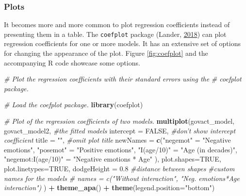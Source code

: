 \documentclass[doc,floatsintext]{apa6}
\newenvironment{Shaded}{\begin{snugshade}}{\end{snugshade}}
\newcommand{\KeywordTok}[1]{\textcolor[rgb]{0.13,0.29,0.53}{\textbf{#1}}}
\newcommand{\DataTypeTok}[1]{\textcolor[rgb]{0.13,0.29,0.53}{#1}}
\newcommand{\FloatTok}[1]{\textcolor[rgb]{0.00,0.00,0.81}{#1}}
\newcommand{\StringTok}[1]{\textcolor[rgb]{0.31,0.60,0.02}{#1}}
\newcommand{\CommentTok}[1]{\textcolor[rgb]{0.56,0.35,0.01}{\textit{#1}}}
\newcommand{\OtherTok}[1]{\textcolor[rgb]{0.56,0.35,0.01}{#1}}
\newcommand{\OperatorTok}[1]{\textcolor[rgb]{0.81,0.36,0.00}{\textbf{#1}}}
\newcommand{\NormalTok}[1]{#1}
\begin{document}
\subsubsection{Plots}\label{plots}

It becomes more and more common to plot regression coefficients instead
of presenting them in a table. The \texttt{coefplot} package (Lander,
\protect\hyperlink{ref-R-coefplot}{2018}) can plot regression
coefficients for one or more models. It has an extensive set of options
for changing the appearance of the plot. Figure \ref{fig:coefplot} and
the accompanying R code showcase some options.

\begin{Shaded}
\begin{Highlighting}[]
\CommentTok{# Plot the regression coefficients with their standard errors using the}
\CommentTok{# coefplot package.}

\CommentTok{# Load the coefplot package.}
\KeywordTok{library}\NormalTok{(coefplot)}

\CommentTok{# Plot of the regression coefficients of two models.}
\KeywordTok{multiplot}\NormalTok{(govact_model, govact_model2, }\CommentTok{#the fitted models}
          \DataTypeTok{intercept =} \OtherTok{FALSE}\NormalTok{, }\CommentTok{#don't show intercept coefficient}
          \DataTypeTok{title =} \StringTok{""}\NormalTok{, }\CommentTok{#omit plot title}
          \DataTypeTok{newNames =} \KeywordTok{c}\NormalTok{(}\StringTok{"negemot"}\NormalTok{ =}\StringTok{ "Negative emotions"}\NormalTok{,}
                       \StringTok{"posemot"}\NormalTok{ =}\StringTok{ "Positive emotions"}\NormalTok{,}
                       \StringTok{"I(age/10)"}\NormalTok{ =}\StringTok{ "Age (in decades)"}\NormalTok{,}
                       \StringTok{"negemot:I(age/10)"}\NormalTok{ =}\StringTok{ "Negative emotions * Age"}
\NormalTok{                       ),}
          \DataTypeTok{plot.shapes=}\OtherTok{TRUE}\NormalTok{, }\DataTypeTok{plot.linetypes=}\OtherTok{TRUE}\NormalTok{,}
          \DataTypeTok{dodgeHeight =} \FloatTok{0.8} \CommentTok{#distance between shapes}
          \CommentTok{#custom names for the models}
          \CommentTok{# names = c("Without interaction", "Neg. emotions*Age interaction")}
\NormalTok{          ) }\OperatorTok{+}
\StringTok{  }\KeywordTok{theme_apa}\NormalTok{() }\OperatorTok{+}
\StringTok{  }\KeywordTok{theme}\NormalTok{(}\DataTypeTok{legend.position=}\StringTok{"bottom"}\NormalTok{)}
\end{Highlighting}
\end{Shaded}
\end{document}
